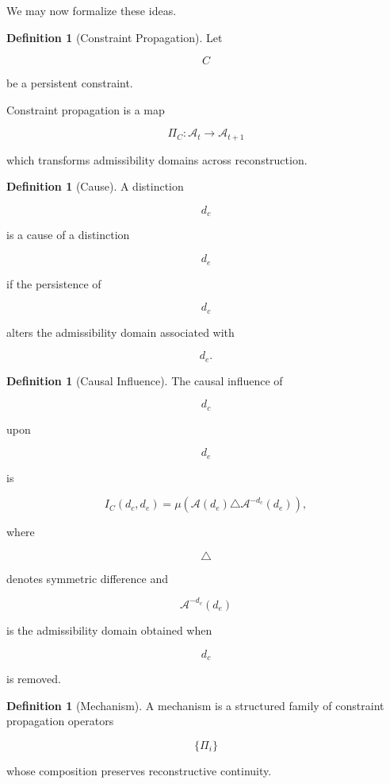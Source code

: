 \documentclass[12pt,oneside]{article}
\theoremstyle{definition}
\newtheorem{definition}[theorem]{Definition} \newtheorem{axiom}[theorem]{Axiom} \newtheorem{remark}[theorem]{Remark} \newtheorem{example}[theorem]{Example}
\begin{document}
We may now formalize these ideas.

\begin{definition}[Constraint Propagation]

Let

\[
C
\]

be a persistent constraint.

Constraint propagation is a map

\[
\Pi_C :
\mathcal A_t
\rightarrow
\mathcal A_{t+1}
\]

which transforms admissibility domains across reconstruction.

\end{definition}

\begin{definition}[Cause]

A distinction

\[
d_c
\]

is a cause of a distinction

\[
d_e
\]

if the persistence of

\[
d_c
\]

alters the admissibility domain associated with

\[
d_e.
\]

\end{definition}

\begin{definition}[Causal Influence]

The causal influence of

\[
d_c
\]

upon

\[
d_e
\]

is

\[
I_C(d_c,d_e)
=
\mu\!\left(
\mathcal A(d_e)
\triangle
\mathcal A^{-d_c}(d_e)
\right),
\]

where

\[
\triangle
\]

denotes symmetric difference and

\[
\mathcal A^{-d_c}(d_e)
\]

is the admissibility domain obtained when

\[
d_c
\]

is removed.

\end{definition}

\begin{definition}[Mechanism]

A mechanism is a structured family of constraint propagation operators

\[
\{\Pi_i\}
\]

whose composition preserves reconstructive continuity.

\end{definition}
\end{document}
